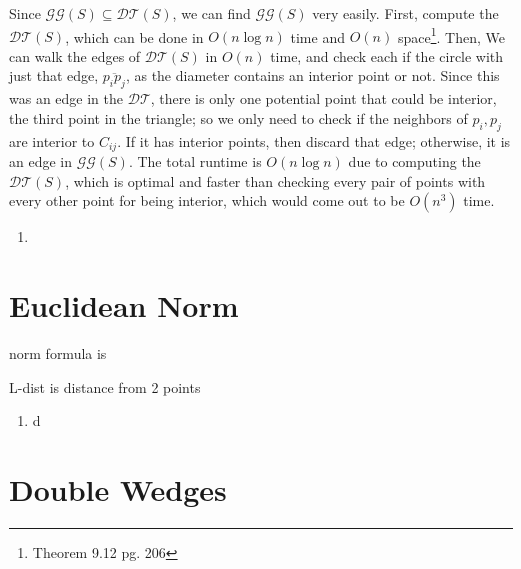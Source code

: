 \documentclass [12pt]{article}
\begin{document}
        Since $\mathcal{GG}(S)\subseteq \mathcal{DT}(S)$, we can find $\mathcal{GG}(S)$ very easily. First, compute the $\mathcal{DT}(S)$, which can be done in $O(n\log n)$ time and $O(n)$ space\footnote{Theorem 9.12 \cite{berg08} pg. 206}. Then, We can walk the edges of $\mathcal{DT}(S)$ in $O(n)$ time, and check each if the circle with just that edge, $\overline{p_i p_j}$, as the diameter contains an interior point or not. Since this was an edge in the $\mathcal{DT}$, there is only one potential point that could be interior, the third point in the triangle; so we only need to check if the neighbors of $p_i, p_j$ are interior to $C_{ij}$. If it has interior points, then discard that edge; otherwise, it is an edge in $\mathcal{GG}(S)$. The total runtime is $O(n\log n)$ due to computing the $\mathcal{DT}(S)$, which is optimal and faster than checking every pair of points with every other point for being interior, which would come out to be $O(n^3)$ time.

        


        \begin{enumerate}[label=\alph*.]
            \item 
        \end{enumerate}
        
    \pagebreak

    
    \section{Euclidean Norm}
    \label{sec:two}

    norm formula is 

    L-dist is distance from 2 points 
    

    \begin{enumerate}[label=\alph*.]
        \item d

    \end{enumerate}


    

        
    \pagebreak



    \section{Double Wedges}
    \label{sec:three}
\end{document}
